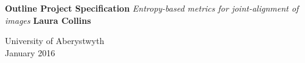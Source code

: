 \documentclass[a4paper,11pt]{report}
\begin{document}




\thispagestyle{empty}
\begin{flushright}

\end{flushright}	
\vskip40mm
\begin{center}
\huge\textbf{Outline Project Specification}
\vskip2mm
\LARGE\textit{Entropy-based metrics for joint-alignment of images}
\vskip5mm
\Large\textbf{Laura Collins}
\normalsize
\end{center}
\vfill
\begin{flushleft}
\large
University of Aberystwyth	\\
January 2016
\end{flushleft}		










\newpage
{}
\tableofcontents



\newpage
{}



\end{document}
